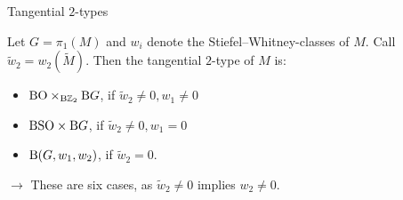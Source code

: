 \documentclass{presis}
\begin{document}
\begin{frame}{Tangential $2$-types}
\begin{thm}
    Let $G = \pi_1(M)$ and $w_i$ denote the Stiefel--Whitney-classes of $M$.
    Call $\widetilde{w}_2= w_2(\widetilde{M})$.
    Then the tangential $2$-type of $M$ is:
    \begin{itemize}
        \item $\mathrm{BO} \times_{\mathrm{B} \mathbb{Z}_2} \mathrm{B} G$, if $\widetilde{w}_2 \neq 0, w_1 \neq 0$
        \item $\mathrm{BSO} \times \mathrm{B} G$, if $\widetilde{w}_2 \neq 0, w_1 = 0$
        \item $\mathrm{B}(G,w_1,w_2)$, if $\widetilde{w}_2 = 0$.
    \end{itemize}
\end{thm}\pause
    $\rightarrow$ These are six cases, as $\widetilde{w}_2 \neq 0$ implies $w_2 \neq 0$.
\end{frame}
\end{document}
